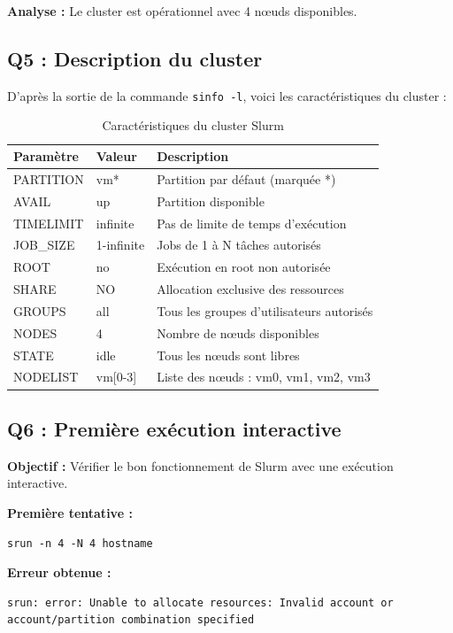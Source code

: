 \documentclass[12pt,a4paper]{article}
\newcommand{\code}[1]{\texttt{#1}}
\begin{document}
\textbf{Analyse :} Le cluster est opérationnel avec 4 nœuds disponibles.

\subsection{Q5 : Description du cluster}

D'après la sortie de la commande \code{sinfo -l}, voici les caractéristiques du cluster :

\begin{table}[h]
\centering
\begin{tabular}{|l|l|p{8cm}|}
\hline
\textbf{Paramètre} & \textbf{Valeur} & \textbf{Description} \\
\hline
PARTITION & vm* & Partition par défaut (marquée *) \\
AVAIL & up & Partition disponible \\
TIMELIMIT & infinite & Pas de limite de temps d'exécution \\
JOB\_SIZE & 1-infinite & Jobs de 1 à N tâches autorisés \\
ROOT & no & Exécution en root non autorisée \\
SHARE & NO & Allocation exclusive des ressources \\
GROUPS & all & Tous les groupes d'utilisateurs autorisés \\
NODES & 4 & Nombre de nœuds disponibles \\
STATE & idle & Tous les nœuds sont libres \\
NODELIST & vm[0-3] & Liste des nœuds : vm0, vm1, vm2, vm3 \\
\hline
\end{tabular}
\caption{Caractéristiques du cluster Slurm}
\end{table}

\subsection{Q6 : Première exécution interactive}

\textbf{Objectif :} Vérifier le bon fonctionnement de Slurm avec une exécution interactive.

\textbf{Première tentative :}
\begin{lstlisting}
srun -n 4 -N 4 hostname
\end{lstlisting}

\textbf{Erreur obtenue :}
\begin{lstlisting}
srun: error: Unable to allocate resources: Invalid account or account/partition combination specified
\end{lstlisting}
\end{document}

